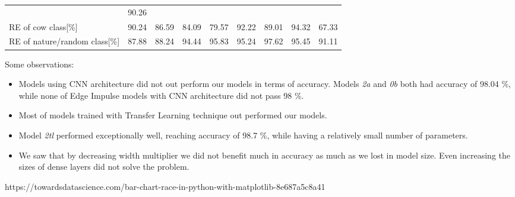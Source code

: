 \begin{table}[!htbp]
{\begin{tabular}{lrrrrrrrr}
                                        & \cellcolor{tbyellow} 90.26 \\
        RE of cow class[\%]             & \cellcolor{tbyellow} 90.24 
                                        & \cellcolor{tbyellow} 86.59 
                                        & \cellcolor{tbyellow} 84.09 
                                        & \cellcolor{tbyellow} 79.57 
                                        & \cellcolor{tbgreeny} 92.22 
                                        & \cellcolor{tbyellow} 89.01 
                                        & \cellcolor{tbgreen} 94.32 
                                        & \cellcolor{tbred} 67.33 \\
        RE of nature/random class[\%]   & \cellcolor{tbyellow} 87.88 
                                        & \cellcolor{tbyellow} 88.24 
                                        & \cellcolor{tbyellow} 94.44 
                                        & \cellcolor{tbgreeny} 95.83 
                                        & \cellcolor{tbgreeny} 95.24 
                                        & \cellcolor{tbgreen} 97.62 
                                        & \cellcolor{tbgreeny} 95.45 
                                        & \cellcolor{tbyellow} 91.11 \\\bottomrule
    \end{tabular}}
    \label{precision_recall_table_ei}
\end{table}
\clearpage

Some observations:
\begin{itemize}
    \item Models using CNN architecture did not out perform our models in terms of accuracy. Models \textit{2a} and \textit{0b} both had accuracy of 98.04 \%, while none of Edge Impulse models with CNN architecture did not pass 98 \%.
    \item Most of models trained with Transfer Learning technique out performed our models.
    \item Model \textit{2tl} performed exceptionally well, reaching accuracy of 98.7 \%, while having a relatively small number of parameters.
    \item We saw that by decreasing width multiplier we did not benefit much in accuracy as much as we lost in model size. Even increasing the sizes of dense layers did not solve the problem. 
\end{itemize}

https://towardsdatascience.com/bar-chart-race-in-python-with-matplotlib-8e687a5c8a41


